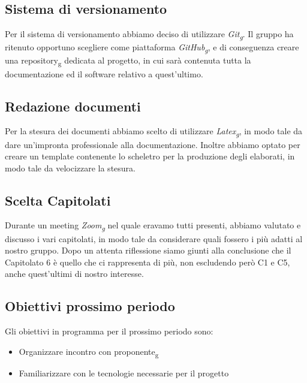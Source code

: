 \subsection{Sistema di versionamento}
Per il sistema di versionamento abbiamo deciso di utilizzare \textit{Git\textsubscript{g}}.  Il gruppo ha ritenuto opportuno scegliere come piattaforma \textit{GitHub\textsubscript{g}}, e di conseguenza creare una repository\textsubscript{g} dedicata al progetto, in cui sarà contenuta tutta la documentazione ed il software relativo a quest'ultimo.

\subsection{Redazione documenti}
Per la stesura dei documenti abbiamo scelto di utilizzare \textit{Latex\textsubscript{g}}, in modo tale da dare un'impronta professionale alla documentazione.  Inoltre abbiamo optato per creare un template contenente lo scheletro per la produzione degli elaborati,  in modo tale da velocizzare la stesura.

\subsection{Scelta Capitolati}
Durante un meeting \textit{Zoom\textsubscript{g}} nel quale eravamo tutti presenti, abbiamo valutato e discusso i vari capitolati,  in modo tale da considerare quali fossero i più adatti al nostro gruppo.  Dopo un attenta riflessione siamo giunti alla conclusione che il Capitolato 6 è quello che ci rappresenta  di più,  non escludendo però C1 e C5, anche quest'ultimi di nostro interesse.

\subsection{Obiettivi prossimo periodo}
Gli obiettivi in programma per il prossimo periodo sono:
\begin{itemize}
\item Organizzare incontro con proponente\textsubscript{g}
\item Familiarizzare con le tecnologie necessarie per il progetto
\end{itemize}
